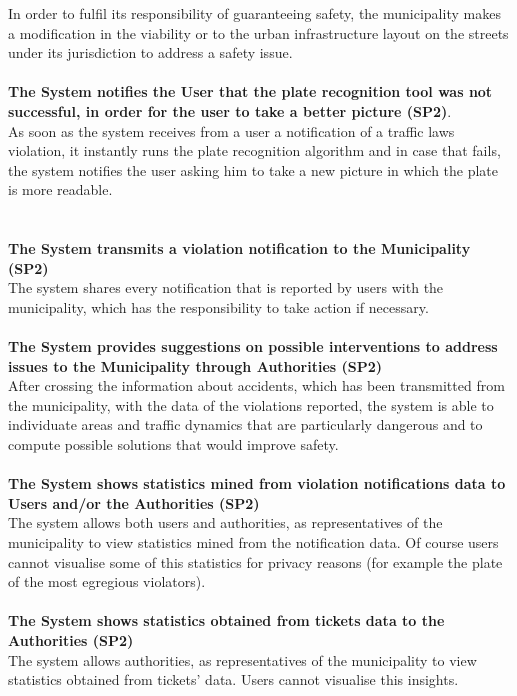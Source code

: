 \documentclass {article}
\begin{document}
		In order to fulfil its responsibility of guaranteeing safety, the municipality makes a modification in the viability or to the urban infrastructure layout on the streets under its jurisdiction to address a safety issue.\\ \\
	{\bf The System notifies the User that the plate recognition tool was not successful, in order for the user to take a better picture (SP2)}. \\
		As soon as the system receives from a user a notification of a traffic laws violation, it instantly runs the plate recognition algorithm and in case that fails, the system notifies the user asking him to take a new picture in which the plate is more readable. \\ \\ \\
	{\bf The System transmits a violation notification to the Municipality (SP2)} \\
		The system shares every notification that is reported by users with the municipality, which has the responsibility to take action if necessary.\\ \\
	{\bf The System provides suggestions on possible interventions to address issues to the Municipality through Authorities (SP2)} \\
		After crossing the information about accidents, which has been transmitted from the municipality, with the data of the violations reported, the system is able to individuate areas and traffic dynamics that are particularly dangerous and to compute possible solutions that would improve safety. \\ \\
	{\bf The System shows statistics mined from violation notifications data to Users and/or the Authorities (SP2)} \\
		The system allows both users and authorities, as representatives of the municipality to view statistics mined from the notification data. Of course users cannot visualise some of this statistics for privacy reasons (for example the plate of the most egregious violators). \\ \\
	{\bf The System shows statistics obtained from tickets data to the Authorities (SP2)}\\
		The system allows authorities, as representatives of the municipality to view statistics obtained from tickets' data. Users cannot visualise this insights. \\ \\
\end{document}
